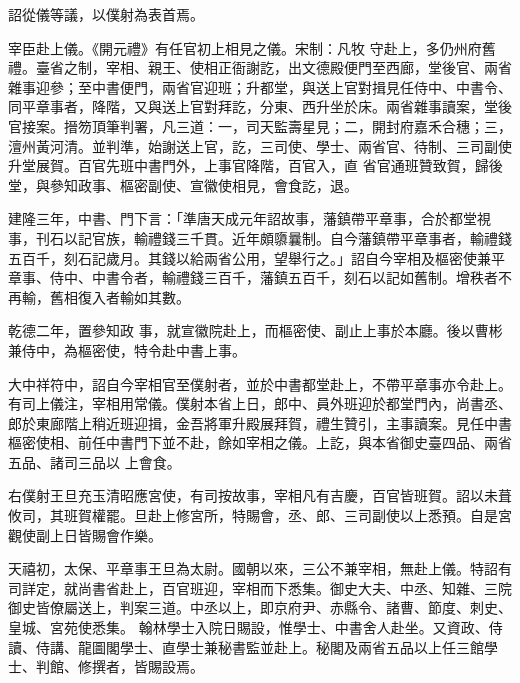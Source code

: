 \begin{pinyinscope}
 詔從儀等議，以僕射為表首焉。



 宰臣赴上儀。《開元禮》有任官初上相見之儀。宋制：凡牧
 守赴上，多仍州府舊禮。臺省之制，宰相、親王、使相正衙謝訖，出文德殿便門至西廊，堂後官、兩省雜事迎參；至中書便門，兩省官迎班；升都堂，與送上官對揖見任侍中、中書令、同平章事者，降階，又與送上官對拜訖，分東、西升坐於床。兩省雜事讀案，堂後官接案。搢笏頂筆判署，凡三道：一，司天監壽星見；二，開封府嘉禾合穗；三，澶州黃河清。並判準，始謝送上官，訖，三司使、學士、兩省官、待制、三司副使升堂展賀。百官先班中書門外，上事官降階，百官入，直
 省官通班贊致賀，歸後堂，與參知政事、樞密副使、宣徽使相見，會食訖，退。



 建隆三年，中書、門下言：「準唐天成元年詔故事，藩鎮帶平章事，合於都堂視事，刊石以記官族，輸禮錢三千貫。近年頗隳曩制。自今藩鎮帶平章事者，輸禮錢五百千，刻石記歲月。其錢以給兩省公用，望舉行之。」詔自今宰相及樞密使兼平章事、侍中、中書令者，輸禮錢三百千，藩鎮五百千，刻石以記如舊制。增秩者不再輸，舊相復入者輸如其數。



 乾德二年，置參知政
 事，就宣徽院赴上，而樞密使、副止上事於本廳。後以曹彬兼侍中，為樞密使，特令赴中書上事。



 大中祥符中，詔自今宰相官至僕射者，並於中書都堂赴上，不帶平章事亦令赴上。有司上儀注，宰相用常儀。僕射本省上日，郎中、員外班迎於都堂門內，尚書丞、郎於東廊階上稍近班迎揖，金吾將軍升殿展拜賀，禮生贊引，主事讀案。見任中書樞密使相、前任中書門下並不赴，餘如宰相之儀。上訖，與本省御史臺四品、兩省五品、諸司三品以
 上會食。



 右僕射王旦充玉清昭應宮使，有司按故事，宰相凡有吉慶，百官皆班賀。詔以未葺攸司，其班賀權罷。旦赴上修宮所，特賜會，丞、郎、三司副使以上悉預。自是宮觀使副上日皆賜會作樂。



 天禧初，太保、平章事王旦為太尉。國朝以來，三公不兼宰相，無赴上儀。特詔有司詳定，就尚書省赴上，百官班迎，宰相而下悉集。御史大夫、中丞、知雜、三院御史皆僚屬送上，判案三道。中丞以上，即京府尹、赤縣令、諸曹、節度、刺史、皇城、宮苑使悉集。
 翰林學士入院日賜設，惟學士、中書舍人赴坐。又資政、侍讀、侍講、龍圖閣學士、直學士兼秘書監並赴上。秘閣及兩省五品以上任三館學士、判館、修撰者，皆賜設焉。




\end{pinyinscope}
